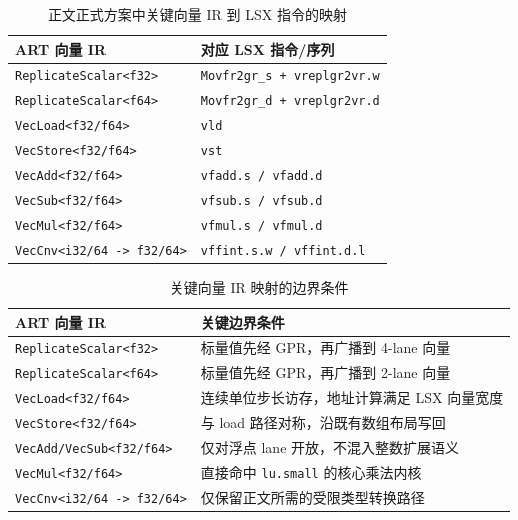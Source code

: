 \begin{table}[htbp]
    \centering
    \small
    \caption{正文正式方案中关键向量 IR 到 LSX 指令的映射}
    \label{tab:ir-to-lsx-mapping}
    \begin{tabular}{p{4.4cm}p{6.2cm}}
        \toprule
        \textbf{ART 向量 IR} & \textbf{对应 LSX 指令/序列} \\
        \midrule
        \texttt{ReplicateScalar<f32>} & \texttt{Movfr2gr\_s + vreplgr2vr.w} \\
        \texttt{ReplicateScalar<f64>} & \texttt{Movfr2gr\_d + vreplgr2vr.d} \\
        \texttt{VecLoad<f32/f64>} & \texttt{vld} \\
        \texttt{VecStore<f32/f64>} & \texttt{vst} \\
        \texttt{VecAdd<f32/f64>} & \texttt{vfadd.s / vfadd.d} \\
        \texttt{VecSub<f32/f64>} & \texttt{vfsub.s / vfsub.d} \\
        \texttt{VecMul<f32/f64>} & \texttt{vfmul.s / vfmul.d} \\
        \texttt{VecCnv<i32/64 -> f32/64>} & \texttt{vffint.s.w / vffint.d.l} \\
        \bottomrule
    \end{tabular}
\end{table}

\begin{table}[htbp]
    \centering
    \small
    \caption{关键向量 IR 映射的边界条件}
    \label{tab:ir-to-lsx-boundary}
    \begin{tabular}{p{4.4cm}p{6.2cm}}
        \toprule
        \textbf{ART 向量 IR} & \textbf{关键边界条件} \\
        \midrule
        \texttt{ReplicateScalar<f32>} & 标量值先经 GPR，再广播到 4-lane 向量 \\
        \texttt{ReplicateScalar<f64>} & 标量值先经 GPR，再广播到 2-lane 向量 \\
        \texttt{VecLoad<f32/f64>} & 连续单位步长访存，地址计算满足 LSX 向量宽度 \\
        \texttt{VecStore<f32/f64>} & 与 load 路径对称，沿既有数组布局写回 \\
        \texttt{VecAdd/VecSub<f32/f64>} & 仅对浮点 lane 开放，不混入整数扩展语义 \\
        \texttt{VecMul<f32/f64>} & 直接命中 \texttt{lu.small} 的核心乘法内核 \\
        \texttt{VecCnv<i32/64 -> f32/64>} & 仅保留正文所需的受限类型转换路径 \\
        \bottomrule
    \end{tabular}
\end{table}

